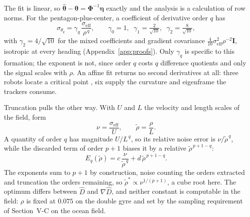 The fit is linear, so $\hat{\boldsymbol{\theta}} -
\boldsymbol{\theta} = \boldsymbol{\Phi}^{-1}\boldsymbol{\eta}$ exactly
and the analysis is a calculation of row norms. For the
pentagon-plus-center, a coefficient of derivative order $q$ has
\begin{equation}
    \sigma_{\theta_q} = \gamma_q\,
    \frac{\sigma_{\mathrm{eff}}}{\rho^{\,q}},
    \qquad
    \gamma_0 = 1, \;\;
    \gamma_1 = \tfrac{2}{\sqrt{10}}, \;\;
    \gamma_2 = \tfrac{8}{\sqrt{10}},
    \label{eq:gain_ladder}
\end{equation}
with $\gamma_2 = 4/\sqrt{10}$ for the mixed coefficients and gradient
covariance $\tfrac{4}{10}\sigma_{\mathrm{eff}}^2\rho^{-2}\mathbf{I}$,
isotropic at every heading (Appendix~\ref{app:proofs}). Only $\gamma_q$ is specific to this
formation; the exponent is not, since order $q$ costs $q$ difference
quotients and only the signal scales with $\rho$. An affine fit returns
no second derivatives at all: three robots locate a critical point
\cite{14}, six supply the curvature and eigenframe the trackers
consume.

Truncation pulls the other way. With $U$ and $L$ the velocity and length
scales of the field, form
\begin{equation}
    \nu = \frac{\sigma_{\mathrm{eff}}}{U}, \qquad
    \tilde{\rho} = \frac{\rho}{L}.
    \label{eq:groups}
\end{equation}
A quantity of order $q$ has magnitude $U/L^{\,q}$, so its relative noise
error is $\nu/\tilde{\rho}^{\,q}$, while the discarded term of order
$p+1$ biases it by a relative $\tilde{\rho}^{\,p+1-q}$:
\begin{equation}
    E_q(\tilde{\rho}) = c\,\frac{\nu}{\tilde{\rho}^{\,q}}
        + d\,\tilde{\rho}^{\,p+1-q}.
    \label{eq:error_budget}
\end{equation}
The exponents sum to $p+1$ by construction, noise counting the orders
extracted and truncation the orders remaining, so $\tilde{\rho}^*
\propto \nu^{1/(p+1)}$, a cube root here. The optimum differs between
$\hat{D}$ and $\nabla\hat{D}$, and neither constant is computable in the
field: $\rho$ is fixed at $0.075$ on the double gyre and set by the sampling requirement of
Section~\mbox{V-C} on the ocean field.

